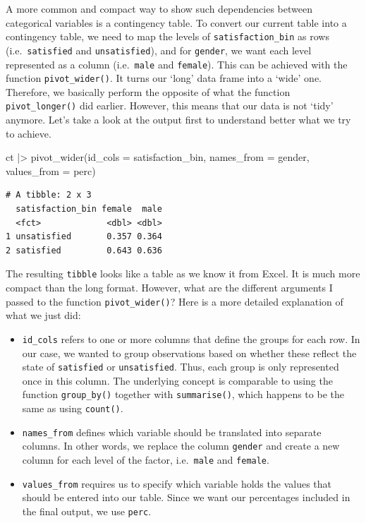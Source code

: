 \documentclass[
  letterpaper,
  DIV=11,
  numbers=noendperiod]{scrreprt}
\newenvironment{Shaded}{\begin{snugshade}}{\end{snugshade}}
\newcommand{\AttributeTok}[1]{\textcolor[rgb]{0.40,0.45,0.13}{#1}}
\newcommand{\FunctionTok}[1]{\textcolor[rgb]{0.28,0.35,0.67}{#1}}
\newcommand{\NormalTok}[1]{\textcolor[rgb]{0.00,0.23,0.31}{#1}}
\newcommand{\SpecialCharTok}[1]{\textcolor[rgb]{0.37,0.37,0.37}{#1}}
\begin{document}
A more common and compact way to show such dependencies between
categorical variables is a contingency table. To convert our current
table into a contingency table, we need to map the levels of
\texttt{satisfaction\_bin} as rows (i.e.~\texttt{satisfied} and
\texttt{unsatisfied}), and for \texttt{gender}, we want each level
represented as a column (i.e.~\texttt{male} and \texttt{female}). This
can be achieved with the function \texttt{pivot\_wider()}. It turns our
`long' data frame into a `wide' one. Therefore, we basically perform the
opposite of what the function \texttt{pivot\_longer()} did earlier.
However, this means that our data is not `tidy' anymore. Let's take a
look at the output first to understand better what we try to achieve.

\begin{Shaded}
\begin{Highlighting}[]
\NormalTok{ct }\SpecialCharTok{|\textgreater{}} \FunctionTok{pivot\_wider}\NormalTok{(}\AttributeTok{id\_cols =}\NormalTok{ satisfaction\_bin,}
                   \AttributeTok{names\_from =}\NormalTok{ gender,}
                   \AttributeTok{values\_from =}\NormalTok{ perc)}
\end{Highlighting}
\end{Shaded}

\begin{verbatim}
# A tibble: 2 x 3
  satisfaction_bin female  male
  <fct>             <dbl> <dbl>
1 unsatisfied       0.357 0.364
2 satisfied         0.643 0.636
\end{verbatim}

The resulting \texttt{tibble} looks like a table as we know it from
Excel. It is much more compact than the long format. However, what are
the different arguments I passed to the function
\texttt{pivot\_wider()}? Here is a more detailed explanation of what we
just did:

\begin{itemize}
\item
  \texttt{id\_cols} refers to one or more columns that define the groups
  for each row. In our case, we wanted to group observations based on
  whether these reflect the state of \texttt{satisfied} or
  \texttt{unsatisfied}. Thus, each group is only represented once in
  this column. The underlying concept is comparable to using the
  function \texttt{group\_by()} together with \texttt{summarise()},
  which happens to be the same as using \texttt{count()}.
\item
  \texttt{names\_from} defines which variable should be translated into
  separate columns. In other words, we replace the column
  \texttt{gender} and create a new column for each level of the factor,
  i.e.~\texttt{male} and \texttt{female}.
\item
  \texttt{values\_from} requires us to specify which variable holds the
  values that should be entered into our table. Since we want our
  percentages included in the final output, we use \texttt{perc}.
\end{itemize}
\end{document}
